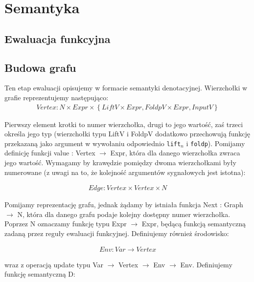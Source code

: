 \documentclass[11pt,leqno]{article}
\begin{document}
\section{Semantyka}

\subsection{Ewaluacja funkcyjna}

\cite[p.~3.3.1]{CC}
\cite[fig. 6]{CC}

\subsection{Budowa grafu}
Ten etap ewaluacji opisujemy w formacie semantyki denotacyjnej. Wierzchołki w grafie reprezentujemy następująco:
\begin{gather}
Vertex : N \times Expr \times \left\{ {LiftV \times Expr, FoldpV \times Expr, InputV}\right\} 
\end{gather}

Pierwszy element krotki to numer wierzchołka, drugi to jego wartość, zaś trzeci określa jego typ (wierzchołki typu LiftV i FoldpV dodatkowo przechowują funkcję przekazaną jako argument w wywołaniu odpowiednio \texttt{lift$_{n}$} i \texttt{foldp}). Pomijamy definicję funkcji value : Vertex $\rightarrow$ Expr, która dla danego wierzchołka zwraca jego wartość. Wymagamy by krawędzie pomiędzy dwoma wierzchołkami były numerowane (z uwagi na to, że kolejność argumentów sygnałowych jest istotna):

\begin{gather}
Edge : Vertex \times Vertex \times N
\end{gather}

Pomijamy reprezentację grafu, jednak żądamy by istniała funkcja Next : Graph $\rightarrow$ N, która dla danego grafu podaje kolejny dostępny numer wierzchołka. Poprzez N oznaczamy funkcję typu Expr $\rightarrow$ Expr, będącą funkcją semantyczną zadaną przez reguły ewaluacji funkcyjnej. Definiujemy również środowisko:

\begin{gather}
Env : Var \rightarrow Vertex  
\end{gather}

wraz z operacją update typu Var $\rightarrow$ Vertex $\rightarrow$ Env $\rightarrow$ Env. Definiujemy funkcję semantyczną D:
\end{document}
